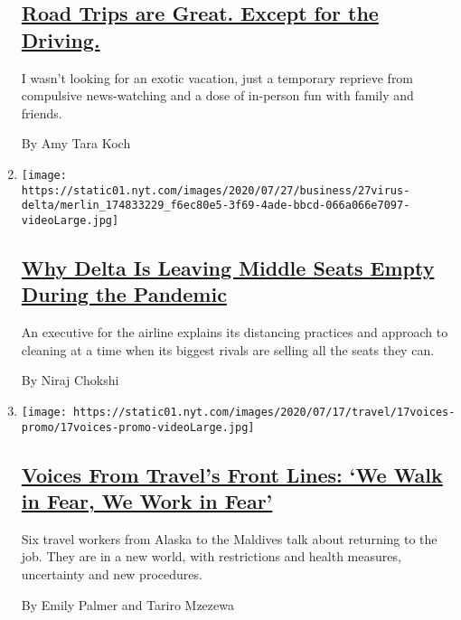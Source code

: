 \begin{enumerate}
  \hypertarget{road-trips-are-great-except-for-the-driving}{%
  \subsection{\texorpdfstring{\href{/2020/07/24/travel/virus-road-trip.html}{Road
  Trips are Great. Except for the
  Driving.}}{Road Trips are Great. Except for the Driving.}}\label{road-trips-are-great-except-for-the-driving}}

  I wasn't looking for an exotic vacation, just a temporary reprieve
  from compulsive news-watching and a dose of in-person fun with family
  and friends.

  By Amy Tara Koch
\item
  \texttt{[image: https://static01.nyt.com/images/2020/07/27/business/27virus-delta/merlin\_174833229\_f6ec80e5-3f69-4ade-bbcd-066a066e7097-videoLarge.jpg]}

  \hypertarget{why-delta-is-leaving-middle-seats-empty-during-the-pandemic}{%
  \subsection{\texorpdfstring{\href{/2020/07/27/business/delta-airlines-bill-lentsch.html}{Why
  Delta Is Leaving Middle Seats Empty During the
  Pandemic}}{Why Delta Is Leaving Middle Seats Empty During the Pandemic}}\label{why-delta-is-leaving-middle-seats-empty-during-the-pandemic}}

  An executive for the airline explains its distancing practices and
  approach to cleaning at a time when its biggest rivals are selling all
  the seats they can.

  By Niraj Chokshi
\item
  \texttt{[image: https://static01.nyt.com/images/2020/07/17/travel/17voices-promo/17voices-promo-videoLarge.jpg]}

  \hypertarget{voices-from-travels-front-lines-we-walk-in-fear-we-work-in-fear}{%
  \subsection{\texorpdfstring{\href{/2020/07/17/travel/coronavirus-travel-hospitality-workers.html}{Voices
  From Travel's Front Lines: `We Walk in Fear, We Work in
  Fear'}}{Voices From Travel's Front Lines: `We Walk in Fear, We Work in Fear'}}\label{voices-from-travels-front-lines-we-walk-in-fear-we-work-in-fear}}

  Six travel workers from Alaska to the Maldives talk about returning to
  the job. They are in a new world, with restrictions and health
  measures, uncertainty and new procedures.

  By Emily Palmer and Tariro Mzezewa
\end{enumerate}


